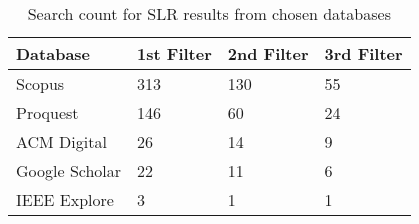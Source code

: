 
\begin{table}[h!]
    \begin{center}
        \caption{Search count for SLR results from chosen databases}
        \label{tab:SLR_Count}
        \begin{tabular}{l|l|l|l} %
            \textbf{Database} & \textbf{1st Filter} & \textbf{2nd Filter} & \textbf{3rd Filter} \\
            \hline
            Scopus            & 313                 & 130                 & 55                  \\
            \hline
            Proquest          & 146                 & 60                  & 24                  \\
            \hline
            ACM Digital       & 26                  & 14                  & 9                   \\
            \hline
            Google Scholar    & 22                  & 11                  & 6                   \\
            \hline
            IEEE Explore      & 3                   & 1                   & 1                   \\
        \end{tabular}
    \end{center}
\end{table}

